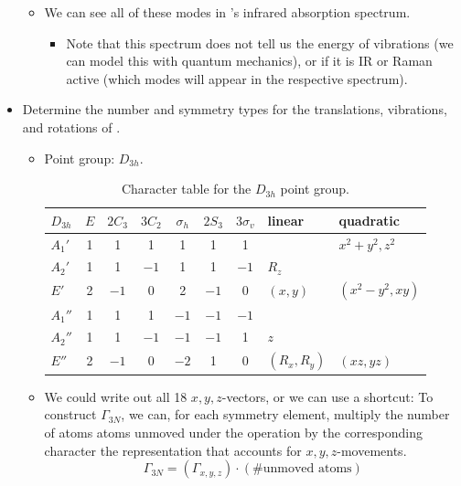 \documentclass[../notes.tex]{subfiles}
\begin{document}
\begin{itemize}
\begin{itemize}
        \item We can see all of these modes in 's infrared absorption spectrum.
        \begin{itemize}
            \item Note that this spectrum does not tell us the energy of vibrations (we can model this with quantum mechanics), or if it is IR or Raman active (which modes will appear in the respective spectrum).
        \end{itemize}
    \end{itemize}
    \item Determine the number and symmetry types for the translations, vibrations, and rotations of .
    \begin{itemize}
        \item Point group: $D_{3h}$.
        \begin{table}[h!]
            \centering
            \small
            \renewcommand{\arraystretch}{1.2}
            \begin{tabular}{l|cccccc|l|l}
                $D_{3h}$ & $E$ & $2C_3$ & $3C_2$ & $\sigma_h$ & $2S_3$ & $3\sigma_v$ & linear & quadratic\\
                \hline
                $A_1'$ & 1 & 1 & 1 & 1 & 1 & 1 & & $x^2+y^2,z^2$\\
                $A_2'$ & 1 & 1 & $-1$ & 1 & 1 & $-1$ & $R_z$ & \\
                $E'$ & 2 & $-1$ & 0 & 2 & $-1$ & 0 & $(x,y)$ & $(x^2-y^2,xy)$\\
                $A_1''$ & 1 & 1 & 1 & $-1$ & $-1$ & $-1$ & & \\
                $A_2''$ & 1 & 1 & $-1$ & $-1$ & $-1$ & 1 & $z$ & \\
                $E''$ & 2 & $-1$ & 0 & $-2$ & 1 & 0 & $(R_x,R_y)$ & $(xz,yz)$\\
            \end{tabular}
            \caption{Character table for the $D_{3h}$ point group.}
            \label{tab:characterTable-D3h}
        \end{table}
        \item We could write out all 18 $x,y,z$-vectors, or we can use a shortcut: To construct $\Gamma_{3N}$, we can, for each symmetry element, multiply the number of atoms atoms unmoved under the operation by the corresponding character the representation that accounts for $x,y,z$-movements.
        \begin{equation*}
            \Gamma_{3N} = (\Gamma_{x,y,z})\cdot(\text{\# unmoved atoms})

\end{equation*}
\end{itemize}
\end{itemize}
\end{document}
